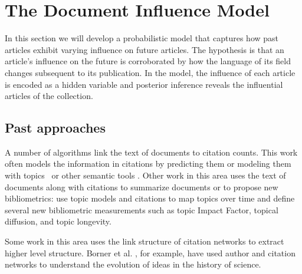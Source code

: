 \section{The Document Influence Model}
\label{section:model}

In this section we will develop a probabilistic model that captures
how past articles exhibit varying influence on future articles.  The
hypothesis is that an article's influence on the future is
corroborated by how the language of its field changes subsequent to
its publication.  In the model, the influence of each article is
encoded as a hidden variable and posterior inference reveals the
influential articles of the collection.

\subsection*{Past approaches}
A number of algorithms link the text of documents to citation counts.
This work often models the information in citations by predicting them
or modeling them with
topics~\cite{nallapati:2008,chang:2009,dietz:2007,Cohn01themissing} or
other semantic tools \cite{mcnee:2002,ibanez:2009}.  Other work in
this area uses the text of documents along with citations to summarize
documents \cite{qazvinian:2008} or to propose new bibliometrics:
\cite{mann:2006} use topic models and citations to map topics over
time and define several new bibliometric measurements such as topic
Impact Factor, topical diffusion, and topic longevity.

Some work in this area uses the link structure of citation networks to
extract higher level structure. Borner et al. \cite{borner:2003}, for
example, have used author and citation networks to understand the
evolution of ideas in the history of science.

